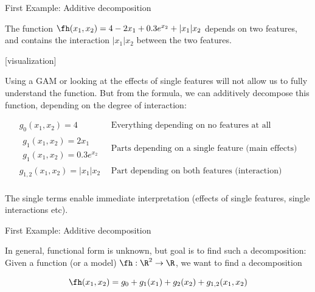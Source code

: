 \documentclass[11pt,compress,t,notes=noshow, aspectratio=169, xcolor=table]{beamer}
\newcommand{\open}{}
\newcommand{\close}{}
\begin{document}
\begin{frame}{First Example: Additive decomposition}

    \begin{example}

        The function \( \fh(x_1, x_2) = 4 - 2x_1 + 0.3 e^{x_2} + |x_1|x_2 \) depends on two features, and contains the interaction \( |x_1|x_2 \) between the two features.
    
        [visualization] 

        Using a GAM or looking at the effects of single features will not allow us to fully understand the function. But from the formula, we can additively decompose this function, depending on the degree of interaction:

        \begin{equation}\label{eq1}
            \begin{split}
                g_0(x_1, x_2) = 4 &  \text{ Everything depending on no features at all}  \\
                \begin{split}
                    g_1(x_1, x_2) = 2x_1 \\
                    g_1(x_1, x_2) =  0.3 e^{x_2}
                \end{split}
                    & \text{ Parts depending on a single feature (main effects)}  \\
                g_{1,2}(x_1, x_2) = |x_1|x_2 & \text{ Part depending on both features (interaction)}  \\
            \end{split}
        \end{equation}
        
        The single terms enable immediate interpretation (effects of single features, single interactions etc). \\
    
    \end{example}

    
    
\end{frame}

\begin{frame}{First Example: Additive decomposition}

    In general, functional form is unknown, but goal is to find such a decomposition:
    Given a function (or a model) \(\fh: \R^2 \to \R\), we want to find a decomposition

    \begin{equation}
        \fh(x_1, x_2) =  g_{0} + g_1(x_1) + g_2(x_2) + g_{\open 1, 2 \close}(x_1, x_2)
    \end{equation}
    
\end{frame}
\end{document}
